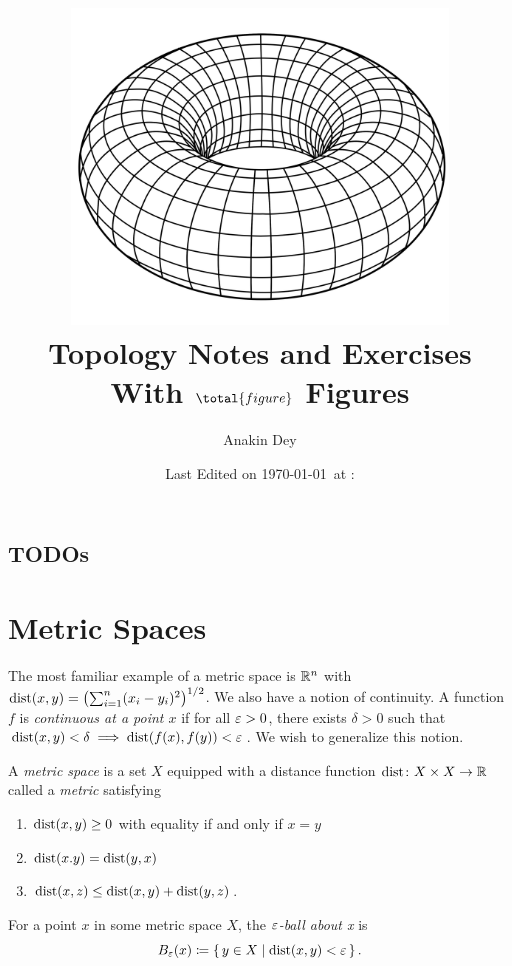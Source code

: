 \documentclass[letterpaper, 11pt, oneside]{book}
\title{\vspace{-100pt}\includegraphics[width=0.75\textwidth]{figs/title.png} \\ {\Huge Topology Notes and Exercises} \\ {\small With $\total{figure}$ Figures}}
\author{\Large Anakin Dey}
\date{\small Last Edited on \today\ at \DTMfetchhour{now}:\DTMfetchminute{now}}
\newcommand{\CoverName}{Cover}
\begin{document}
\frontmatter
\renewcommand{\thepage}{\CoverName}
\maketitle


\section*{TODOs}




\tableofcontents
\clearpage


\listoftheorems[ignoreall, show={defn}, title={List of Definitions}]

\listoftheorems[ignoreall, show={ex}, title={List of Examples and Counterexamples}]

\mainmatter

\chapter{Metric Spaces}

The most familiar example of a metric space is $\mathbb{R}^{n}$ with $\dist(x, y) = \pqty{\sum_{i = 1}^{n} (x_{i} - y_{i})^{2}}^{1/2}$.
We also have a notion of continuity.
A function $f$ is \emph{continuous at a point $x$} if for all $\varepsilon > 0$, there exists $\delta > 0$ such that $\operatorname{dist}(x, y) < \delta \implies \operatorname{dist}(f(x), f(y)) < \varepsilon$.
We wish to generalize this notion.

\begin{defn}
  A \emph{metric space} is a set $X$ equipped with a distance function $\operatorname{dist}\colon X \times X \to \mathbb{R}$ called a \emph{metric} satisfying
  \begin{enumerate}
    \item $\operatorname{dist}(x, y) \geq 0$ with equality if and only if $x = y$
    \item $\operatorname{dist}(x. y) = \operatorname{dist}(y, x)$
    \item $\operatorname{dist}(x, z) \leq \operatorname{dist}(x, y) + \operatorname{dist}(y, z)$.
  \end{enumerate}
\end{defn}

\begin{defn}[$\e$-ball]
  For a point $x$ in some metric space $X$, the \emph{$\e$-ball about x} is
  \[
    B_{\varepsilon}(x) \coloneqq \set{y \in X | \operatorname{dist}(x, y) < \varepsilon}.
  \]
\end{defn}
\end{document}
